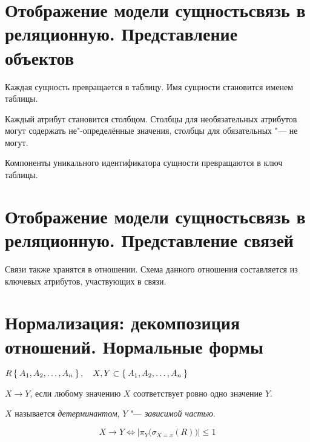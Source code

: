\section{Отображение модели сущностьсвязь в реляционную. Представление объектов}

Каждая сущность превращается в таблицу.
Имя сущности становится именем таблицы.

Каждый атрибут становится столбцом.
Столбцы для необязательных атрибутов могут содержать не"-определённые значения, столбцы для обязательных "--- не могут.

Компоненты уникального идентификатора сущности превращаются в ключ таблицы.

\section{Отображение модели сущностьсвязь в реляционную. Представление связей}

Связи также хранятся в отношении.
Схема данного отношения составляется из ключевых атрибутов, участвующих в связи.

\section{Нормализация: декомпозиция отношений. Нормальные формы}

\begin{definition}
	$ R \Set{A_1, A_2, \dots, A_n}, \quad X, Y \subset \Set{A_1, A_2, \dots, A_n} $

	$ X \to Y $, если любому значению $ X $ соответствует ровно одно значение $ Y $.

	$ X $ называется \emph{детерминантом}, $ Y $ "--- \emph{зависимой частью}.
\end{definition}

$$ X \to Y \iff \left| \pi_Y \bigl( \sigma_{X = x}(R) \bigr) \right| \le 1 $$

%

